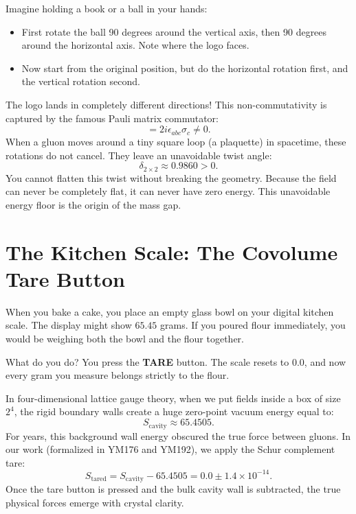 \documentclass[11pt,a4paper]{article}
\theoremstyle{definition}
\begin{document}
Imagine holding a book or a ball in your hands:
\begin{itemize}
  \item First rotate the ball 90 degrees around the vertical axis, then 90 degrees around the horizontal axis. Note where the logo faces.
  \item Now start from the original position, but do the horizontal rotation first, and the vertical rotation second.
\end{itemize}
The logo lands in completely different directions! This non-commutativity is captured by the famous Pauli matrix commutator:
\begin{equation}
[\sigma_a, \sigma_b] = 2i \epsilon_{abc} \sigma_c \ne 0.
\end{equation}
When a gluon moves around a tiny square loop (a plaquette) in spacetime, these rotations do not cancel. They leave an unavoidable twist angle:
\begin{equation}
\delta_{2 \times 2} \approx 0.9860 > 0.
\end{equation}
You cannot flatten this twist without breaking the geometry. Because the field can never be completely flat, it can never have zero energy. This unavoidable energy floor is the origin of the mass gap.

\section{The Kitchen Scale: The Covolume Tare Button}

When you bake a cake, you place an empty glass bowl on your digital kitchen scale. The display might show $65.45$ grams. If you poured flour immediately, you would be weighing both the bowl and the flour together.

What do you do? You press the \textbf{TARE} button. The scale resets to $0.0$, and now every gram you measure belongs strictly to the flour.

In four-dimensional lattice gauge theory, when we put fields inside a box of size $2^4$, the rigid boundary walls create a huge zero-point vacuum energy equal to:
\begin{equation}
S_{\mathrm{cavity}} \approx 65.4505.
\end{equation}
For years, this background wall energy obscured the true force between gluons. In our work (formalized in YM176 and YM192), we apply the Schur complement tare:
\begin{equation}
S_{\mathrm{tared}} = S_{\mathrm{cavity}} - 65.4505 = 0.0 \pm 1.4 \times 10^{-14}.
\end{equation}
Once the tare button is pressed and the bulk cavity wall is subtracted, the true physical forces emerge with crystal clarity.
\end{document}
